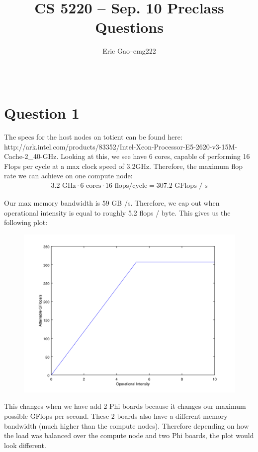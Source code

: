 \documentclass[11pt]{article}
\title{CS 5220 -- Sep. 10 Preclass Questions} %
\author{
  \begin{tabular}{l c l}
    Eric Gao & -- & emg222\\
  \end{tabular}\\
  \rule{\linewidth}{0.4pt}
}
\date{}
\begin{document}
    \thispagestyle{empty}
    \maketitle

    \section*{Question 1}
        The specs for the host nodes on totient can be found here: http://ark.intel.com/products/83352/Intel-Xeon-Processor-E5-2620-v3-15M-Cache-2\_40-GHz. Looking at this, we see have 6 cores, capable of performing 16 Flops per cycle at a max clock speed of 3.2GHz. Therefore, the maximum flop rate we can achieve on one compute node:
        \begin{align*}
            3.2 \text{ GHz} \cdot 6 \text{ cores} \cdot 16 \text{ flops/cycle} = 307.2 \text{ GFlops / s}
        \end{align*}

        Our max memory bandwidth is 59 GB /s. Therefore, we cap out when operational intensity is equal to roughly 5.2 flops / byte. This gives us the following plot:
        \begin{figure}[H]
            \centering
            \includegraphics[width=5in]{q1.png}
        \end{figure}

        This changes when we have add 2 Phi boards because it changes our maximum possible GFlops per second. These 2 boards also have a different memory bandwidth (much higher than the compute nodes). Therefore depending on how the load was balanced over the compute node and two Phi boards, the plot would look different.
\end{document}

